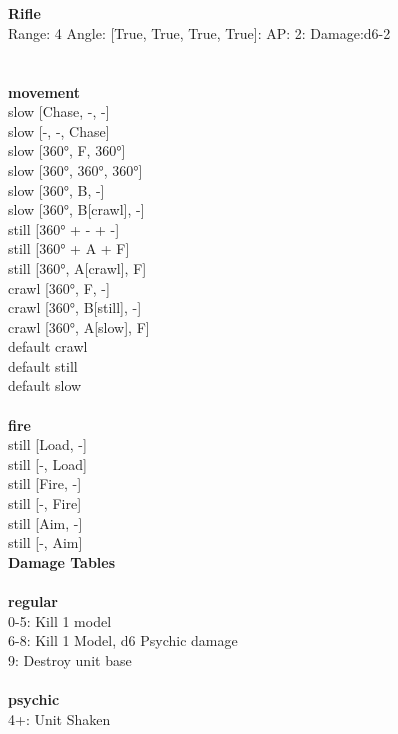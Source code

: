 \ \\

\ \\
{\bf Rifle } \\



Range: 4  Angle: [True, True, True, True]: AP: 2: Damage:d6-2 \\




 
\ \\



\ \\ {\bf movement } \\
slow [Chase, -, -] \\
slow [-, -, Chase] \\
slow [360°, F, 360°] \\
slow [360°, 360°, 360°] \\
slow [360°, B, -] \\
slow [360°, B[crawl], -] \\
still [360° + - + -] \\
still [360° + A + F] \\
still [360°, A[crawl], F] \\
crawl [360°, F, -] \\
crawl [360°, B[still], -] \\
crawl [360°, A[slow], F] \\
default crawl \\
default still \\
default slow \\
\ \\ {\bf fire } \\
still [Load, -] \\
still [-, Load] \\
still [Fire, -] \\
still [-, Fire] \\
still [Aim, -] \\
still [-, Aim] \\


{\bf Damage Tables} \\
\ \\ {\bf regular } \\
0-5: Kill 1 model \\
6-8: Kill 1 Model, d6 Psychic damage \\
9: Destroy unit base \\
\ \\ {\bf psychic } \\
4+: Unit Shaken \\










